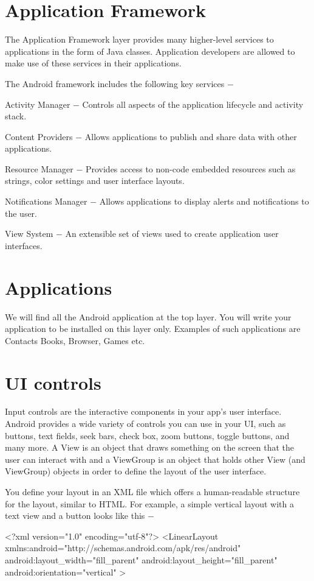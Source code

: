 \documentclass{fisatproject}
\begin{document}
\section{Application Framework}
The Application Framework layer provides many higher-level services to applications in the form of Java classes. Application developers are allowed to make use of these services in their applications.

The Android framework includes the following key services −

Activity Manager − Controls all aspects of the application lifecycle and activity stack.

Content Providers − Allows applications to publish and share data with other applications.

Resource Manager − Provides access to non-code embedded resources such as strings, color settings and user interface layouts.

Notifications Manager − Allows applications to display alerts and notifications to the user.

View System − An extensible set of views used to create application user interfaces.
\section{Applications}
We will find all the Android application at the top layer. You will write your application to be installed on this layer only. Examples of such applications are Contacts Books, Browser, Games etc.
\section{UI controls}
Input controls are the interactive components in your app's user interface. Android provides a wide variety of controls you can use in your UI, such as buttons, text fields, seek bars, check box, zoom buttons, toggle buttons, and many more.
A View is an object that draws something on the screen that the user can interact with and a ViewGroup is an object that holds other View (and ViewGroup) objects in order to define the layout of the user interface.

You define your layout in an XML file which offers a human-readable structure for the layout, similar to HTML. For example, a simple vertical layout with a text view and a button looks like this −

<?xml version="1.0" encoding="utf-8"?>
<LinearLayout xmlns:android="http://schemas.android.com/apk/res/android"
   android:layout_width="fill_parent"
   android:layout_height="fill_parent"
   android:orientation="vertical" >
   
\end{document}
